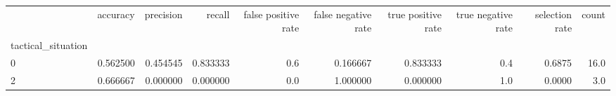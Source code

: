 \begin{tabular}{lrrrrrrrrr}
\toprule
{} &  accuracy &  precision &    recall &  false positive rate &  false negative rate &  true positive rate &  true negative rate &  selection rate &  count \\
tactical\_situation &           &            &           &                      &                      &                     &                     &                 &        \\
\midrule
0                  &  0.562500 &   0.454545 &  0.833333 &                  0.6 &             0.166667 &            0.833333 &                 0.4 &          0.6875 &   16.0 \\
2                  &  0.666667 &   0.000000 &  0.000000 &                  0.0 &             1.000000 &            0.000000 &                 1.0 &          0.0000 &    3.0 \\
\bottomrule
\end{tabular}
